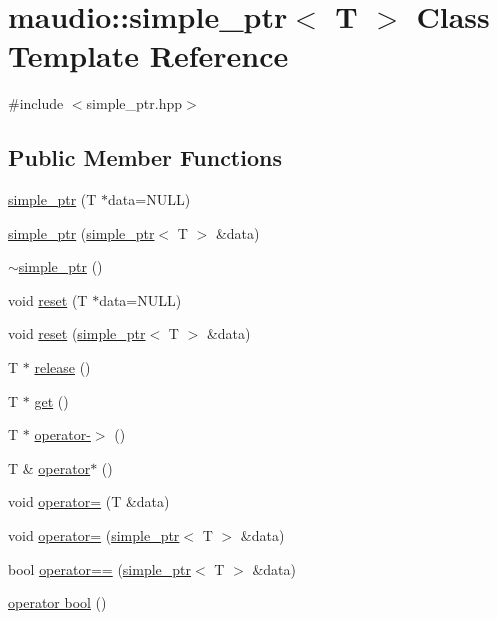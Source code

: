 \hypertarget{classmaudio_1_1simple__ptr}{\section{maudio\-:\-:simple\-\_\-ptr$<$ T $>$ Class Template Reference}
\label{classmaudio_1_1simple__ptr}
}


{\ttfamily \#include $<$simple\-\_\-ptr.\-hpp$>$}

\subsection*{Public Member Functions}
\begin{DoxyCompactItemize}
\item 
\hyperlink{classmaudio_1_1simple__ptr_ab56e81788cacd5aa507833db4fd44bd8}{simple\-\_\-ptr} (T $\ast$data=N\-U\-L\-L)
\item 
\hyperlink{classmaudio_1_1simple__ptr_a8cba474ba00b1b94c49c707d9424b078}{simple\-\_\-ptr} (\hyperlink{classmaudio_1_1simple__ptr}{simple\-\_\-ptr}$<$ T $>$ \&data)
\item 
\hyperlink{classmaudio_1_1simple__ptr_a88310827fe1d7a361cc3fb9b787d4503}{$\sim$simple\-\_\-ptr} ()
\item 
void \hyperlink{classmaudio_1_1simple__ptr_a3eebcda59c83170bafcdab6018425501}{reset} (T $\ast$data=N\-U\-L\-L)
\item 
void \hyperlink{classmaudio_1_1simple__ptr_a6d2901d4228bfb62202a245c30eb240e}{reset} (\hyperlink{classmaudio_1_1simple__ptr}{simple\-\_\-ptr}$<$ T $>$ \&data)
\item 
T $\ast$ \hyperlink{classmaudio_1_1simple__ptr_a1a1592b302bab798fc08413a670d8807}{release} ()
\item 
T $\ast$ \hyperlink{classmaudio_1_1simple__ptr_a63b3da7d10ed480dd6a826dd6b51f76e}{get} ()
\item 
T $\ast$ \hyperlink{classmaudio_1_1simple__ptr_a4c76bf724a04025a4bd0e348f19e14c1}{operator-\/$>$} ()
\item 
T \& \hyperlink{classmaudio_1_1simple__ptr_a66f558bb874abcd373528908c9b9b985}{operator$\ast$} ()
\item 
void \hyperlink{classmaudio_1_1simple__ptr_a3eac5c9986e5550506b6a730456319d5}{operator=} (T \&data)
\item 
void \hyperlink{classmaudio_1_1simple__ptr_a19f92329a0e55c1491ada84f53983341}{operator=} (\hyperlink{classmaudio_1_1simple__ptr}{simple\-\_\-ptr}$<$ T $>$ \&data)
\item 
bool \hyperlink{classmaudio_1_1simple__ptr_aff5acc470b657ab9584f481bfe9314ec}{operator==} (\hyperlink{classmaudio_1_1simple__ptr}{simple\-\_\-ptr}$<$ T $>$ \&data)
\item 
\hyperlink{classmaudio_1_1simple__ptr_aac5cd27ca0b9e02c0d8b0945d5a66b53}{operator bool} ()
\end{DoxyCompactItemize}


